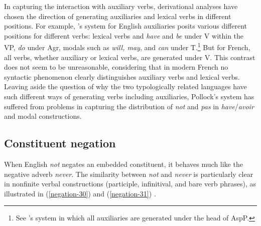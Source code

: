 \documentclass[output=paper
                ,modfonts
                ,nonflat
	        ,collection
	        ,collectionchapter
	        ,collectiontoclongg
 	        ,biblatex
                ,babelshorthands
                ,newtxmath
                ,draftmode
                ,colorlinks, citecolor=brown
]{./langsci/langscibook}
\begin{document}
{\begin{exe}
\begin{xlist}
\begin{exe}
\begin{xlist}
{In capturing the interaction with auxiliary verbs, derivational analyses have chosen the direction of generating
auxiliaries and lexical  verbs in different positions. For example,
\citet{Pollock:89}'s system for English auxiliaries posits
various different positions for different verbs: lexical
verbs and \textit{have} and \textit{be} under V within the VP,
\textit{do} under Agr, modals such as \textit{will, may}, and \textit{can}
under T.\footnote{See \citep{Ouhalla:91}'s system in which
all auxiliaries are generated under the head of AspP.} But for French,
all verbs, whether
auxiliary or lexical  verbs, are generated under V.
This contrast does not seem to be unreasonable, considering that in
modern French no syntactic phenomenon clearly distinguishes auxiliary
verbs and lexical  verbs. Leaving aside the question of why the two
typologically related languages have such different ways of generating
verbs including auxiliaries, Pollock's system has suffered
from problems in capturing the distribution of \textit{not} and
\textit{pas} in \textit{have}/\textit{avoir} and modal constructions.}
\fi

\subsection{Constituent negation}

When English \textit{not} negates an embedded constituent, it behaves
much like the negative adverb \textit{never}. The similarity between {\it
not} and \textit{never} is particularly clear in nonfinite verbal
constructions (participle, infinitival, and bare verb phrases), as
illustrated in (\ref{negation-30}) and (\ref{negation-31}) \citep{Klima:64, Baker:89,Baker:91}.

\eal\label{negation-30}
\zl


\end{xlist}
\end{exe}
\end{xlist}
\end{exe}}
\end{document}
